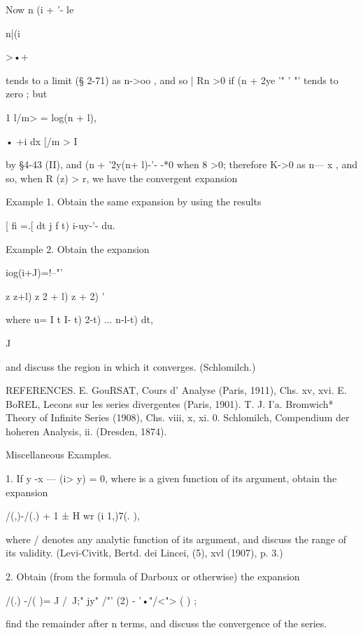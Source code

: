 {{Now n (i + '- le



n|(i



>•+



tends to a limit (§ 2-71) as n->oo , and so | Rn >0 if (n + 2ye '" '
"' tends to zero ; but

1 l/m> = log(n + l),



• +i dx [/m > I

by §4-43 (II), and (n + '2y(n+ l)-'- -*0 when 8 >0; therefore K->0 as
n— x , and so, when R (z) > r, we have the convergent expansion



Example 1. Obtain the same expansion by using the results



[ fi =.[ dt j f t) i-uy-'- du.



Example 2. Obtain the expansion



iog(i+J)=!--"'



z z+l) z 2 + l) z + 2) '

where u= I t I- t) 2-t) ... n-l-t) dt,

J

and discuss the region in which it converges. (Schlomilch.)

REFERENCES. E. GouRSAT, Cours d' Analyse (Paris, 1911), Chs. xv, xvi.
E. BoREL, Lecons sur les series divergentes (Paris, 1901). T. J. I'a.
Bromwich* Theory of Infinite Series (1908), Chs. viii, x, xi. 0.
Schlomilch, Compendium der hoheren Analysis, ii. (Dresden, 1874).

Miscellaneous Examples.

1. If y -x — (i> y) = 0, where is a given function of its argument,
obtain the expansion

/(,)-/(.) + 1 ± H wr (i 1,)7(. ),

where / denotes any analytic function of its argument, and discuss the
range of its validity. (Levi-Civitk, Bertd. dei Lincei, (5), xvl
(1907), p. 3.)

2. Obtain (from the formula of Darboux or otherwise) the expansion

/(.) -/( )= J /~J;" jy" /"' (2) - '•"/<"> ( ) ;

find the remainder after n terms, and discuss the convergence of the
series.

}}
